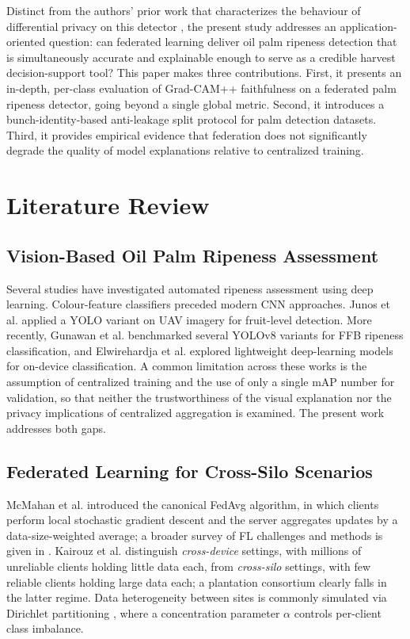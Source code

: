 \documentclass[9pt,twocolumn]{extarticle}
\begin{document}
Distinct from the authors' prior work that characterizes the behaviour of differential privacy on this detector \cite{dianty2026}, the present study addresses an application-oriented question: can federated learning deliver oil palm ripeness detection that is simultaneously accurate and explainable enough to serve as a credible harvest decision-support tool? This paper makes three contributions. First, it presents an in-depth, per-class evaluation of Grad-CAM++ faithfulness on a federated palm ripeness detector, going beyond a single global metric. Second, it introduces a bunch-identity-based anti-leakage split protocol for palm detection datasets. Third, it provides empirical evidence that federation does not significantly degrade the quality of model explanations relative to centralized training.

\section{Literature Review}

\subsection{Vision-Based Oil Palm Ripeness Assessment}

Several studies have investigated automated ripeness assessment using deep learning. Colour-feature classifiers \cite{sabri2017} preceded modern CNN approaches. Junos et al. \cite{junos2022} applied a YOLO variant on UAV imagery for fruit-level detection. More recently, Gunawan et al. \cite{gunawan2023} benchmarked several YOLOv8 variants for FFB ripeness classification, and Elwirehardja et al. \cite{elwirehardja2021} explored lightweight deep-learning models for on-device classification. A common limitation across these works is the assumption of centralized training and the use of only a single mAP number for validation, so that neither the trustworthiness of the visual explanation nor the privacy implications of centralized aggregation is examined. The present work addresses both gaps.

\subsection{Federated Learning for Cross-Silo Scenarios}

McMahan et al. \cite{mcmahan2017} introduced the canonical FedAvg algorithm, in which clients perform local stochastic gradient descent and the server aggregates updates by a data-size-weighted average; a broader survey of FL challenges and methods is given in \cite{li2020fl}. Kairouz et al. \cite{kairouz2021} distinguish \emph{cross-device} settings, with millions of unreliable clients holding little data each, from \emph{cross-silo} settings, with few reliable clients holding large data each; a plantation consortium clearly falls in the latter regime. Data heterogeneity between sites is commonly simulated via Dirichlet partitioning \cite{hsu2019}, where a concentration parameter $\alpha$ controls per-client class imbalance.
\end{document}
